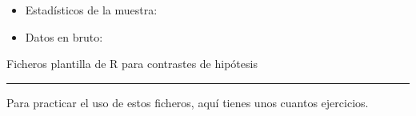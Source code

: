 \documentclass[10pt,a4paper]{article}\usepackage[]{graphicx}\usepackage[]{color}
\newcounter {cont01}
\begin{document}
\begin{table}[b!]
{\begin{minipage}{15cm}
\begin{itemize}
\begin{itemize}
\begin{itemize}
                  \item Estadísticos de la muestra:

                  \item Datos en bruto:

                \end{itemize}\end{itemize}

    \end{itemize}
\end{minipage}
}
  \caption{Ficheros plantilla de R para contrastes de hipótesis}
  \label{tut07:tabla:FicherosPlantillaRContrastes}
\hrule
\end{table}

Para practicar el uso de estos ficheros, aquí tienes unos cuantos ejercicios.
\end{document}
